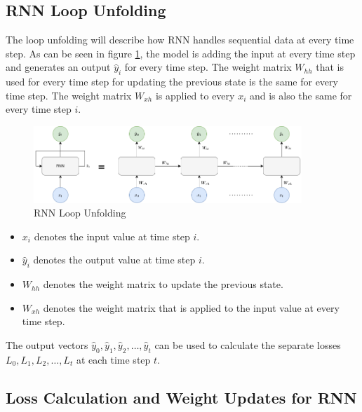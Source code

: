         \subsection{RNN Loop Unfolding}
        \label{sec:rnn-loop-unfolding-background}

            The loop unfolding will describe how RNN handles sequential data at every time step.
            As can be seen in figure \ref{fig:rnn-loop-unfolding}, the model is adding the input at every time step and generates an output $\hat{y}_i$ for every time step.
            The weight matrix $W_{hh}$ that is used for every time step for updating the previous state is the same for every time step.
            The weight matrix $W_{xh}$ is applied to every $x_i$ and is also the same for every time step $i$.

            \begin{figure}[h!]
                \centering
                \includegraphics[width=0.90\textwidth]{figures/rnn_loop_unfolding.drawio.png}
                \caption{RNN Loop Unfolding}
                \label{fig:rnn-loop-unfolding}
            \end{figure}
            \begin{itemize}[label=\textemdash]
                \item $x_i$ denotes the input value at time step $i$.
                \item $\hat{y}_i$ denotes the output value at time step $i$.
                \item $W_{hh}$ denotes the weight matrix to update the previous state.
                \item $W_{xh}$ denotes the weight matrix that is applied to the input value at every time step.
            \end{itemize}
            The output vectors $\hat{y}_0, \hat{y}_1, \hat{y}_2, \dots, \hat{y}_t$ can be used to calculate the separate losses $L_0, L_1, L_2, \dots, L_t$ at each time step $t$.

        \subsection{Loss Calculation and Weight Updates for RNN}
        \label{sec:loss-calculation-and-weight-updates-for-rnn-background}
        
